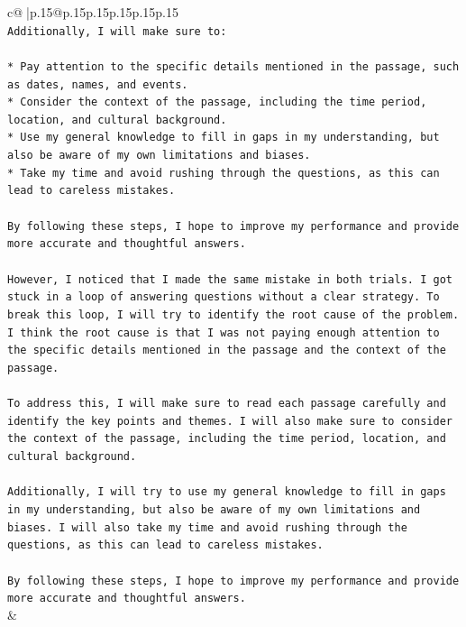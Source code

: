 \documentclass{article}
\begin{document}
{\begin{supertabular}{c@{$\;$}|p{.15\linewidth}@{}p{.15\linewidth}p{.15\linewidth}p{.15\linewidth}p{.15\linewidth}p{.15\linewidth}}
{{{\\ 
\texttt{Additionally, I will make sure to:} \\
\\ 
\texttt{* Pay attention to the specific details mentioned in the passage, such as dates, names, and events.} \\
\texttt{* Consider the context of the passage, including the time period, location, and cultural background.} \\
\texttt{* Use my general knowledge to fill in gaps in my understanding, but also be aware of my own limitations and biases.} \\
\texttt{* Take my time and avoid rushing through the questions, as this can lead to careless mistakes.} \\
\\ 
\texttt{By following these steps, I hope to improve my performance and provide more accurate and thoughtful answers.} \\
\\ 
\texttt{However, I noticed that I made the same mistake in both trials. I got stuck in a loop of answering questions without a clear strategy. To break this loop, I will try to identify the root cause of the problem. I think the root cause is that I was not paying enough attention to the specific details mentioned in the passage and the context of the passage.} \\
\\ 
\texttt{To address this, I will make sure to read each passage carefully and identify the key points and themes. I will also make sure to consider the context of the passage, including the time period, location, and cultural background.} \\
\\ 
\texttt{Additionally, I will try to use my general knowledge to fill in gaps in my understanding, but also be aware of my own limitations and biases. I will also take my time and avoid rushing through the questions, as this can lead to careless mistakes.} \\
\\ 
\texttt{By following these steps, I hope to improve my performance and provide more accurate and thoughtful answers.} \\
            }
        }
    }
    & \\ \\

\end{supertabular}
}
\end{document}
